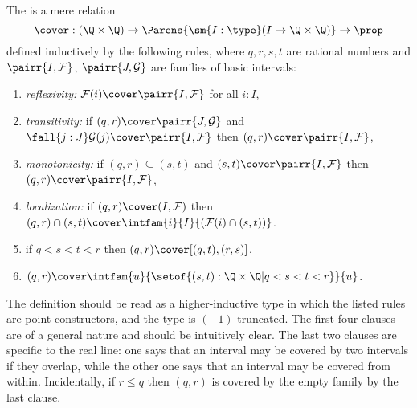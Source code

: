\begin{defn} \label{defn:inductive-cover}
  The 
  is a mere relation
  \begin{equation*}
    {\cover} : (\Q \times \Q) \to \Parens{\sm{I : \type} (I \to \Q \times \Q)} \to \prop
  \end{equation*}
  defined inductively by the following rules, where $q, r, s, t$ are rational numbers and
  $\pairr{I, \mathcal{F}}$, $\pairr{J, \mathcal{G}}$ are families of basic intervals:
  \begin{enumerate}

  \item \emph{reflexivity:}
    $\mathcal{F}(i) \cover \pairr{I, \mathcal{F}}$ for all $i : I$,

  \item \emph{transitivity:}
    if $(q, r) \cover \pairr{J, \mathcal{G}}$ and $\fall{j : J} \mathcal{G}(j) \cover \pairr{I,\mathcal{F}}$
    then $(q, r) \cover \pairr{I, \mathcal{F}}$,

  \item \emph{monotonicity:}
    if $(q, r) \subseteq (s, t)$ and $(s,t) \cover \pairr{I, \mathcal{F}}$ then $(q, r) \cover
    \pairr{I, \mathcal{F}}$,

  \item \emph{localization:}
    if $(q, r) \cover (I, \mathcal{F})$ then $(q, r) \cap (s, t) \cover
    \intfam{i}{I}{(\mathcal{F}(i) \cap (s, t))}$.

  \item \label{defn:inductive-cover-interval-1}
    if $q < s < t < r$ then $(q, r) \cover [(q, t), (r, s)]$,

  \item \label{defn:inductive-cover-interval-2}
    $(q, r) \cover \intfam{u}{\setof{ (s,t) : \Q \times \Q | q < s < t < r}}{u}$.
  \end{enumerate}
\end{defn}

The definition should be read as a higher-inductive type in which the listed rules are
point constructors, and the type is $(-1)$-truncated. The first four clauses are of a
general nature and should be intuitively clear. The last two clauses are specific to the
real line: one says that an interval may be covered by two intervals if they overlap,
while the other one says that an interval may be covered from within. Incidentally, if $r
\leq q$ then $(q, r)$ is covered by the empty family by the last clause.

